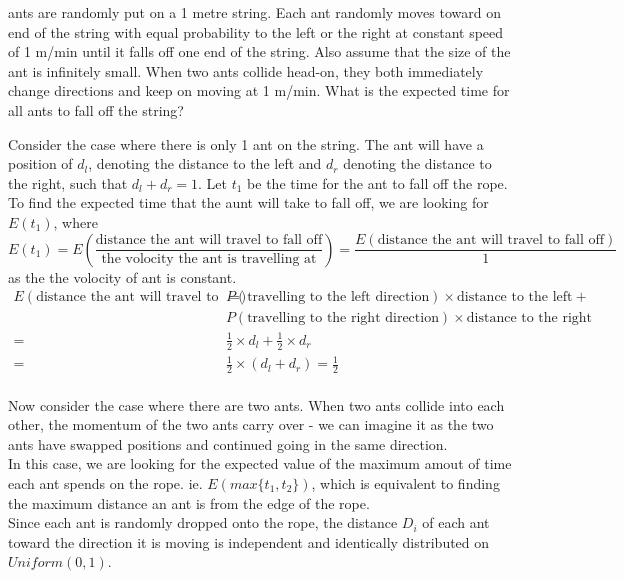 \documentclass[answers]{exam}
\begin{document}
\begin{questions}
    
 ants are randomly put on a 1 metre string. 
Each ant randomly moves toward on end of the string with equal 
probability to the left or the right at constant speed of 1 m/min 
until it falls off one end of the string. 
Also assume that the size of the ant is infinitely small. 
When two ants collide head-on, they both immediately change directions 
and keep on moving at 1 m/min. 
What is the expected time for all ants to fall off the string?

\begin{solution}
    Consider the case where there is only 1 ant on the string. The ant will 
have a position of $d_l$, denoting the distance to the left and $d_r$ denoting 
the distance to the right, such that $d_l+d_r = 1$.\newline 
Let $t_1$ be the time for the ant to fall off the rope. To find
 the expected time that the aunt will take to fall off, 
 we are
looking for $E(t_1)$, where
$$E(t_1) = E(\frac{\text{distance the ant will travel to fall off}}{\text{the volocity the ant is travelling at}})=\frac{E(\text{distance the ant will travel to fall off})}{1}$$
as the the volocity of ant is constant. 
\begin{align*}
    E(\text{distance the ant will travel to fall off})=&
    P(\text{travelling to the left direction})\times
    \text{distance to the left}+\\
    &P(\text{travelling to the right direction})\times
    \text{distance to the right}\\
    =&\frac{1}{2}\times d_l + \frac{1}{2} \times d_r\\
    =&\frac{1}{2}\times (d_l+d_r)
    =\frac{1}{2}
\end{align*}
\\
Now consider the case where there are two ants. When two ants collide into each other,
the momentum of the two ants carry over - we can imagine it as the two ants have swapped positions and
continued going in the same direction.\\
In this case, we are looking for the expected value of the maximum amout of time each ant spends on the rope.
ie. $E(max\{t_1, t_2\})$, which is equivalent to finding the maximum distance an ant is from the edge of the rope.\\
Since each ant is randomly dropped onto the rope, the distance $D_i$ of each ant toward the direction it is moving is 
independent and identically distributed on $Uniform(0,1)$. 

\end{solution}
\end{questions}
\end{document}

